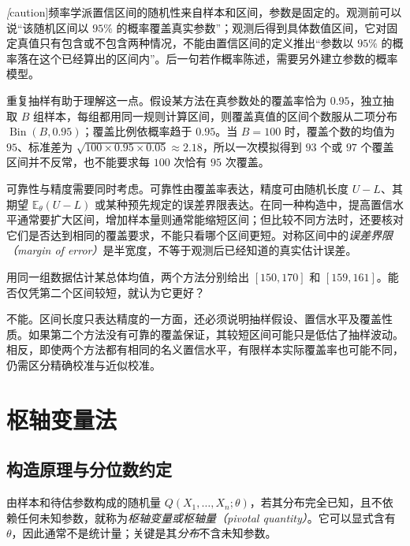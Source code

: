 \emph[caution]{频率学派置信区间的随机性来自样本和区间，参数是固定的。}观测前可以说“该随机区间以 $95\%$ 的概率覆盖真实参数”；观测后得到具体数值区间，它对固定真值只有包含或不包含两种情况，不能由置信区间的定义推出“参数以 $95\%$ 的概率落在这个已经算出的区间内”。后一句若作概率陈述，需要另外建立参数的概率模型。

重复抽样有助于理解这一点。假设某方法在真参数处的覆盖率恰为 $0.95$，独立抽取 $B$ 组样本，每组都用同一规则计算区间，则覆盖真值的区间个数服从二项分布 $\operatorname{Bin}(B,0.95)$；覆盖比例依概率趋于 $0.95$。当 $B=100$ 时，覆盖个数的均值为 $95$、标准差为 $\sqrt{100\times0.95\times0.05}\approx2.18$，所以一次模拟得到 $93$ 个或 $97$ 个覆盖区间并不反常，也不能要求每 $100$ 次恰有 $95$ 次覆盖。

可靠性与精度需要同时考虑。可靠性由覆盖率表达，精度可由随机长度 $U-L$、其期望 $\mathbb E_\theta(U-L)$ 或某种预先规定的误差界限表达。在同一种构造中，提高置信水平通常要扩大区间，增加样本量则通常能缩短区间；但比较不同方法时，还要核对它们是否达到相同的覆盖要求，不能只看哪个区间更短。对称区间中的\emph{误差界限（margin of error）}是半宽度，不等于观测后已经知道的真实估计误差。

\begin{example}
\label{ex:study-confidence-interpretation}
用同一组数据估计某总体均值，两个方法分别给出 $[150,170]$ 和 $[159,161]$。能否仅凭第二个区间较短，就认为它更好？
\end{example}
\begin{solve}
不能。区间长度只表达精度的一方面，还必须说明抽样假设、置信水平及覆盖性质。如果第二个方法没有可靠的覆盖保证，其较短区间可能只是低估了抽样波动。相反，即使两个方法都有相同的名义置信水平，有限样本实际覆盖率也可能不同，仍需区分精确校准与近似校准。
\end{solve}

\section{枢轴变量法}
\label{sec:study-pivotal-quantity}

\subsection{构造原理与分位数约定}
\label{subsec:study-pivot-construction}

\begin{definition}
\label{def:study-pivotal-quantity}
由样本和待估参数构成的随机量 $Q(X_1,\ldots,X_n;\theta)$，若其分布完全已知，且不依赖任何未知参数，就称为\emph{枢轴变量或枢轴量（pivotal quantity）}。它可以显式含有 $\theta$，因此通常不是统计量；关键是其\emph{分布}不含未知参数。
\end{definition}

